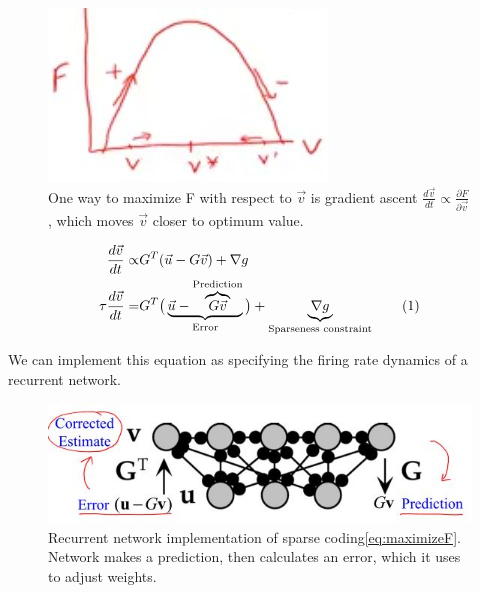 \documentclass[]{article}
\newcommand\numberthis{\addtocounter{equation}{1}\tag{\theequation}}
\begin{document}
\begin{figure}[H]
	\begin{center}
		\caption[One way to maximize F with respect to $\vec{v}$ is Gradient Ascent]{One way to maximize F with respect to $\vec{v}$ is gradient ascent $\frac{d\vec{v}}{dt} \propto \frac{\partial F}{\partial\vec{v}}$, which moves $\vec{v}$ closer to optimum value.}
		\includegraphics[width=\textwidth]{gradient-ascent}
	\end{center}
\end{figure}

\begin{align*}
	\frac{d\vec{v}}{dt} \propto& G^T(\vec{u} -G \vec{v}) + \nabla g\\
	\tau \frac{d\vec{v}}{dt} =& G^T\big(\underbrace{\vec{u} -\overbrace{G \vec{v}}^\text{Prediction}}_\text{Error}\big) + \underbrace{\nabla g}_\text{Sparseness constraint}\numberthis\label{eq:maximizeF}
\end{align*}

We can implement this equation as specifying the firing rate dynamics of a recurrent network.

\begin{figure}[H]
	\begin{center}
		\caption[Recurrent network implementation of sparse coding\eqref{eq:maximizeF}]{Recurrent network implementation of sparse coding\eqref{eq:maximizeF}. Network makes a prediction, then calculates an error, which it uses to adjust weights.}
		\includegraphics[width=\textwidth]{recurrent-sparse}
	\end{center}
\end{figure}
\end{document}
